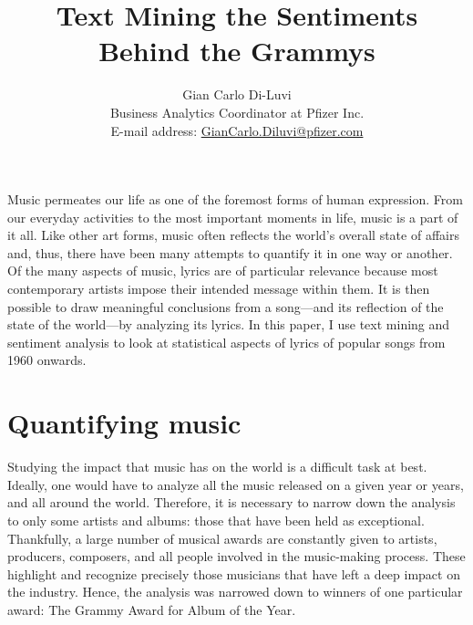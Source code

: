 \documentclass{article}
\begin{document}
\title{\vspace{-1.2cm}Text Mining the Sentiments Behind the Grammys}
\author{Gian Carlo Di-Luvi \\
{\normalsize Business Analytics Coordinator at Pfizer Inc.} \\
{\normalsize E-mail address: \href{mailto:giancarlo.diluvi@pfizer.com}{GianCarlo.Diluvi@pfizer.com}}}
\date{}

\maketitle


Music permeates our life as one of the foremost forms of human expression. From our everyday activities to the most important moments in life, music is a part of it all. Like other art forms, music often reflects the world's overall state of affairs and, thus, there have been many attempts to quantify it in one way or another. Of the many aspects of music, lyrics are of particular relevance because most contemporary artists impose their intended message within them. It is then possible to draw meaningful conclusions from a song---and its reflection of the state of the world---by analyzing its lyrics. In this paper, I use text mining and sentiment analysis to look at statistical aspects of lyrics of popular songs from 1960 onwards.










\section*{Quantifying music}


Studying the impact that music has on the world is a difficult task at best. Ideally, one would have to analyze all the music released on a given year or years, and all around the world. Therefore, it is necessary to narrow down the analysis to only some artists and albums: those that have been held as exceptional. Thankfully, a large number of musical awards are constantly given to artists, producers, composers, and all people involved in the music-making process. These highlight and recognize precisely those musicians that have left a deep impact on the industry. Hence, the analysis was narrowed down to winners of one particular award: The Grammy Award for Album of the Year.  \\
\end{document}
